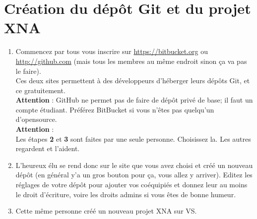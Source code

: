 \documentclass[a4paper]{article}
\begin{document}
\section{Création du  dépôt Git et du projet XNA}


\begin{enumerate}
    \item Commencez par tous vous inscrire sur \url{https://bitbucket.org} ou
    \url{http://github.com} (mais tous les membres au même endroit sinon ça va
    pas le faire). \\
    Ces deux sites permettent à des développeurs d'héberger leurs dépôts Git, et ce
    gratuitement.\\
    \textbf{Attention} : GitHub ne permet pas de faire de dépôt privé
    de base; il faut un compte étudiant. Préférez BitBucket si vous n'êtes pas
    quelqu'un d'opensource.\\

    {\color{red} \textbf{Attention} : \\Les étapes \textbf{2} et \textbf{3}
    sont faites par une seule personne. Choisissez la. Les autres regardent et
    l'aident.}\\

    \item L'heureux élu se rend donc sur le site que vous avez choisi et créé un
    nouveau dépôt (en général y'a un gros bouton pour ça, vous allez y
    arriver). Editez les r\'eglages de votre d\'epôt pour ajouter vos
    co\'equipi\'es et donnez leur au moins le droit d'\'ecriture, voire les
    droits admins si vous êtes de bonne humeur. \\

    \item Cette même personne créé un nouveau projet XNA sur VS.
\end{enumerate}
\end{document}
